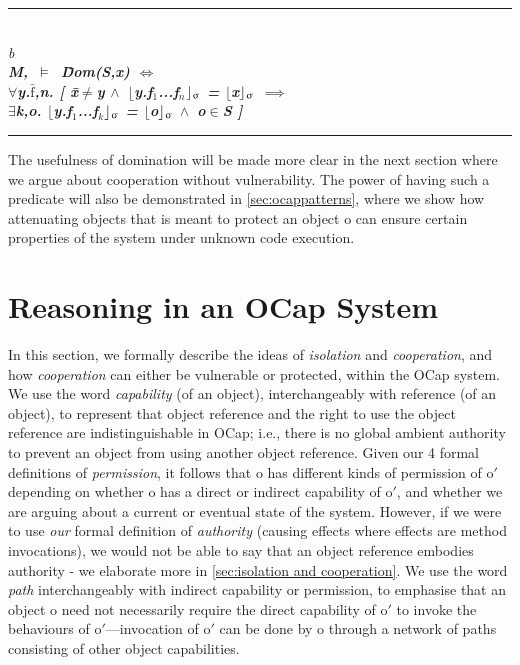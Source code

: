 \documentclass[a4paper,11pt,twoside]{article}
\makeatletter
\newenvironment{logic}
{\begin{minipage}[c]{\linewidth}  \sffamily \mdseries \begin{tabbing}}
{\end{tabbing}\end{minipage}\vspace{0.3em}}
\newcommand{\loin}{$\in$}
\newcommand{\loforall}{$\forall$}
\newcommand{\loexists}{$\exists$}
\newcommand{\loand}{$\land$}
\newcommand{\loneq} {$\neq$}
\newcommand{\loimplies}{$\implies$}
\newcommand{\losigma}{\text{$\upsigma$}}
\newcommand{\loturns} {$\vDash$}
\newcommand{\loiff} {$\iff$}
\newcommand{\loexec}[2] {$\lfloor$#1$\rfloor _{\text{#2}}$}
\newcommand{\loconj}[1] {$\bar{\text{#1}}$}
\newcommand{\hr}{\rule{\linewidth}{0.4pt}}
\DeclareRobustCommand{\emp}{%
  \@nomath\em \if b\expandafter\@car\f@series\@nil
  \normalfont \else \sffamily \bfseries \fi}
\makeatother
\begin{document}
\begin{logic}
\hr\\
\emp{Definition---[Domination]}\\
M,\losigma\ \loturns\ \=Dom(S,x) \loiff \\
\> \loforall y.\loconj{f},n. [ \= x\loneq y \loand\ \loexec{y.f$_1$...f$_n$}{\losigma} = \loexec{x}{\losigma} \loimplies\\
\>\> \loexists k,o. \loexec{y.f$_1$...f$_k$}{\losigma} = \loexec{o}{\losigma} \loand\ o\loin S ]\\
\hr
\end{logic}
The usefulness of domination will be made more clear in the next section where we argue about cooperation without vulnerability. The power of having such a predicate will also be demonstrated in \cref{sec:ocappatterns}, where we show how attenuating objects that is meant to protect an object o can ensure certain properties of the system under unknown code execution.\\
\section{Reasoning in an OCap System}\label{sec:ocapreasoning}

In this section, we formally describe the ideas of \textit{isolation} and \textit{cooperation}, and how \textit{cooperation} can either be vulnerable or protected, within the OCap system. We use the word \textit{capability} (of an object), interchangeably with reference (of an object), to represent that object reference and the right to use the object reference are indistinguishable in OCap; i.e., there is no global ambient authority to prevent an object from using another object reference. Given our 4 formal definitions of \textit{permission}, it follows that o has different kinds of permission of o$'$ depending on whether o has a direct or indirect capability of o$'$, and whether we are arguing about a current or eventual state of the system. However, if we were to use \textit{our} formal definition of \textit{authority} (causing effects where effects are method invocations), we would not be able to say that an object reference embodies authority - we elaborate more in \cref{sec:isolation and cooperation}. We use the word \textit{path} interchangeably with indirect capability or permission, to emphasise that an object o need not necessarily require the direct capability of o$'$ to invoke the behaviours of o$'$---invocation of o$'$ can be done by o through a network of paths consisting of other object capabilities.\\
\end{document}
